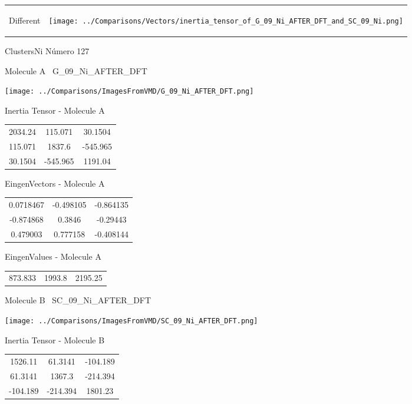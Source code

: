 \vtab[-5mm]
\begin{tabular}{*{2}{m{}}}
\begin{center}
\textcolor{NavyBlue}{\Large Different}
\end{center}
&
\begin{center}
\texttt{[image: ../Comparisons/Vectors/inertia\_tensor\_of\_G\_09\_Ni\_AFTER\_DFT\_and\_SC\_09\_Ni.png]}
\end{center}
\end{tabular}

 \newpage

\vtab[-3cm]
\begin{center}
{\large ClustersNi \tab Número 127}
\end{center}
\begin{multicols}{2}
\begin{center}

Molecule A \
G\_09\_Ni\_AFTER\_DFT

\texttt{[image: ../Comparisons/ImagesFromVMD/G\_09\_Ni\_AFTER\_DFT.png]}

Inertia Tensor - Molecule A \\
\begin{tabular}{|c c c|}
2034.24	 & 	115.071	 & 	30.1504	 \\
115.071	 & 	1837.6	 & 	-545.965	 \\
30.1504	 & 	-545.965	 & 	1191.04
\end{tabular}

\vtab
 EingenVectors - Molecule A     \\
\begin{tabular}{|c c c|}
0.0718467	 & 	-0.498105	 & 	-0.864135	 \\
-0.874868	 & 	0.3846	 & 	-0.29443	 \\
0.479003	 & 	0.777158	 & 	-0.408144
\end{tabular}

\vtab
 EingenValues - Molecule A     \\
\begin{tabular}{|c c c|}
873.833	 & 	1993.8	 & 	2195.25	 \\
\end{tabular}
\columnbreak

Molecule B \
SC\_09\_Ni\_AFTER\_DFT

\texttt{[image: ../Comparisons/ImagesFromVMD/SC\_09\_Ni\_AFTER\_DFT.png]}

Inertia Tensor - Molecule B \\
\begin{tabular}{|c c c|}
1526.11	 & 	61.3141	 & 	-104.189	 \\
61.3141	 & 	1367.3	 & 	-214.394	 \\
-104.189	 & 	-214.394	 & 	1801.23
\end{tabular}


\end{center}
\end{multicols}
